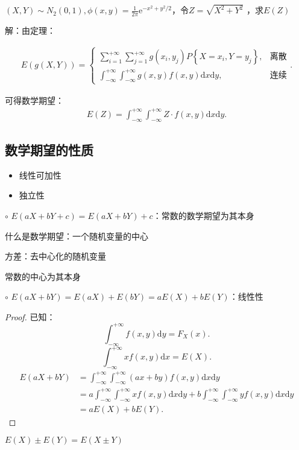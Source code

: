 \begin{eg}
    $(X,Y)\sim N_2\left( 0,1 \right) ,\phi\left( x,y \right) =\frac{1}{2\pi}\mathrm{e}^{-x^2+y^2 /2}$，令$Z=\sqrt{X^2+Y^2} $ ，求$E\left( Z \right) $
\end{eg}
解：由定理：
\begin{rrule}
    \begin{align*}
        E\left( g\left( X,Y \right)  \right) =\begin{cases}
            {\sum_{i=1}^{+\infty}{\sum_{j=1}^{+\infty} g\left( x_{i},y_{j} \right) P\left\{ X=x_{i},Y=y_{j} \right\}} },&\text{离散}\\
            {\int_{-\infty}^{+\infty}{\int_{-\infty}^{+\infty} g\left( x,y \right) f\left( x,y \right)  \mathrm{d}x} \mathrm{d}y},&\text{连续}
        \end{cases}
    .\end{align*}
\end{rrule}
可得数学期望：
\begin{align*}
    E\left( Z \right) =\int_{-\infty}^{+\infty} \int_{-\infty}^{+\infty} Z\cdot f\left( x,y \right)  \mathrm{d}x \mathrm{d}y
.\end{align*}
\subsection{数学期望的性质}%
\label{sub:数学期望的性质}
\begin{itemize}
    \item 线性可加性
    \item 独立性
\end{itemize}
$\circ$ $E\left( aX+bY+c \right) =E\left( aX+bY \right) +c$：常数的数学期望为其本身
\begin{notation}
    什么是数学期望：一个随机变量的中心

    方差：去中心化的随机变量

    常数的中心为其本身
\end{notation}
$\circ$ $E\left( aX+bY \right) =E\left( aX \right) +E\left( bY \right) =aE\left( X \right) +bE\left( Y \right) $：线性性
\begin{proof}
    已知：\[
        \int_{-\infty}^{+\infty} f\left( x,y \right)  \mathrm{d}y=F_X\left( x \right) 
    .\] 
    \[
        \int_{-\infty}^{+\infty} xf\left( x,y \right)  \mathrm{d}x=E\left( X \right) 
    .\] 
    \begin{align*}
        E\left( aX+bY \right) &=\int_{-\infty}^{+\infty} \int_{-\infty}^{+\infty} \left( ax+by \right) f\left( x,y \right)  \mathrm{d}x \mathrm{d}y \\
        &= a \int_{-\infty}^{+\infty} \int_{-\infty}^{+\infty} xf\left( x,y \right)  \mathrm{d}x \mathrm{d}y +b \int_{-\infty}^{+\infty} \int_{-\infty}^{+\infty} yf\left( x,y \right)  \mathrm{d}x  \mathrm{d}y\\
        &= aE\left( X \right) +bE\left( Y \right)
    .\end{align*}
\end{proof}
\begin{eg}
    $E\left( X \right) \pm E\left( Y \right) =E\left( X\pm Y \right) $
\end{eg}

